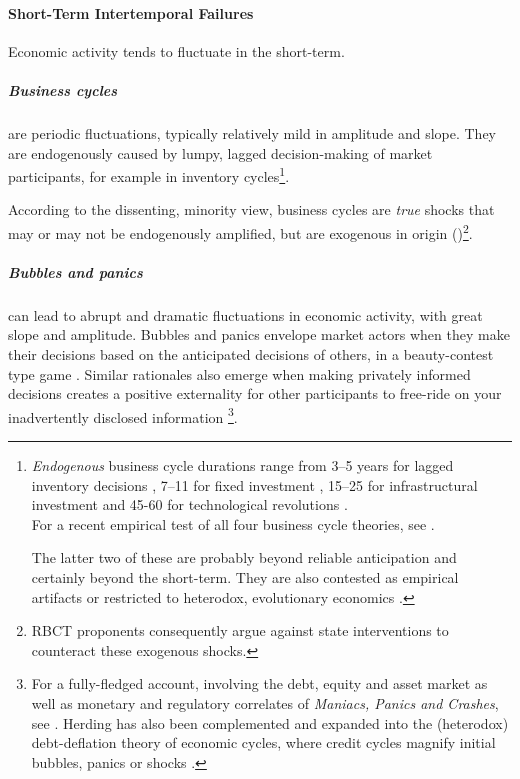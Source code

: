 \paragraph{Short-Term Intertemporal Failures} \label{sec:short-term-inconsistency} Economic activity tends to fluctuate in the short-term. 

\subparagraph{Business cycles} are periodic fluctuations, typically relatively mild in amplitude and slope. They are endogenously caused by lumpy, lagged decision-making of market participants, for example in inventory cycles\footnote{
	\emph{Endogenous} business cycle durations range from 3--5 years for lagged inventory decisions \citep{Kitchin1923}, 7--11 for fixed investment \citep{Juglar1862}, 15--25 for infrastructural investment \citep{Kuznets1930} and 45-60 for technological revolutions \citep{Kondratiev1925}. \\ For a recent empirical test of all four business cycle theories, see \cite{Korotayev2010}.
	
	The latter two of these are probably beyond reliable anticipation and certainly beyond the short-term. They are also contested as empirical artifacts \citep{Howrey1968} or restricted to heterodox, evolutionary economics \citep{Modelski2010}.}.

According to the dissenting, minority view, business cycles are \emph{true} shocks that may or may not be endogenously amplified, but are exogenous in origin (\citealt{Kydland1982})\footnote{
	\gls{RBCT} proponents consequently argue against state interventions to counteract these exogenous shocks.}.

\subparagraph{Bubbles and panics} can lead to abrupt and dramatic fluctuations in economic activity, with great slope and amplitude. Bubbles and panics envelope market actors when they make their decisions based on the anticipated decisions of others, in a beauty-contest type game \citep{Keynes1936}. Similar rationales also emerge when making privately informed decisions creates a positive externality for other participants to free-ride on your inadvertently disclosed information \citep{Banerjee-1992-aa}\footnote{
	For a fully-fledged account, involving the debt, equity and asset market as well as monetary and regulatory correlates of \emph{Maniacs, Panics and Crashes}, see \cite{KindlebergerAliber-2005-aa}. Herding has also been complemented and expanded into the (heterodox) debt-deflation theory of economic cycles, where credit cycles magnify initial bubbles, panics or shocks \citep{Fisher1933}.}.

